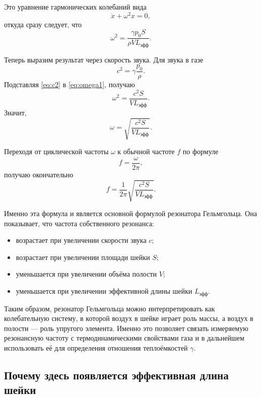 \documentclass[a4paper,12pt]{article}
\begin{document}
	Это уравнение гармонических колебаний вида
	\[
	\ddot{x}+\omega^2 x=0,
	\]
	откуда сразу следует, что
	\begin{equation}
		\omega^2=\frac{\gamma p_0 S}{\rho V L_{\text{эфф}}}.
		\label{eq:omega1}
	\end{equation}
	
	\medskip
	
	Теперь выразим результат через скорость звука. Для звука в газе
	\begin{equation}
		c^2=\gamma\frac{p_0}{\rho}.
		\label{eq:c2}
	\end{equation}
	Подставляя \eqref{eq:c2} в \eqref{eq:omega1}, получаю
	\begin{equation}
		\omega^2=\frac{c^2S}{V L_{\text{эфф}}}.
		\label{eq:omega2}
	\end{equation}
	Значит,
	\begin{equation}
		\omega=\sqrt{\frac{c^2S}{V L_{\text{эфф}}}}.
	\end{equation}
	
	Переходя от циклической частоты \(\omega\) к обычной частоте \(f\) по формуле
	\[
	f=\frac{\omega}{2\pi},
	\]
	получаю окончательно
	\begin{equation}
		f=\frac{1}{2\pi}\sqrt{\frac{c^2S}{V L_{\text{эфф}}}}.
		\label{eq:helmholtz}
	\end{equation}
	
	Именно эта формула и является основной формулой резонатора Гельмгольца. Она показывает, что частота собственного резонанса:
	\begin{itemize}
		\item возрастает при увеличении скорости звука \(c\);
		\item возрастает при увеличении площади шейки \(S\);
		\item уменьшается при увеличении объёма полости \(V\);
		\item уменьшается при увеличении эффективной длины шейки \(L_{\text{эфф}}\).
	\end{itemize}
	
	Таким образом, резонатор Гельмгольца можно интерпретировать как колебательную систему, в которой воздух в шейке играет роль массы, а воздух в полости --- роль упругого элемента. Именно это позволяет связать измеряемую резонансную частоту с термодинамическими свойствами газа и в дальнейшем использовать её для определения отношения теплоёмкостей \(\gamma\).
	\subsection{Почему здесь появляется эффективная длина шейки}
	
\end{document}

